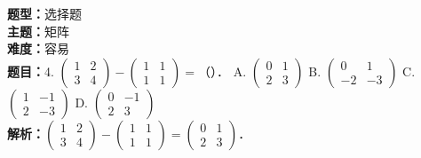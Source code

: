 \documentclass{ctexart}
\newenvironment{question}[5]{%
	\noindent\textbf{题型：}#1\\
	\textbf{主题：}#2\\
	\textbf{难度：}#3\\
	\textbf{题目：}#4\\
	\textbf{解析：}#5\\
	\vspace{1em}
}{}
\begin{document}
	\begin{question}
		{选择题}
		{矩阵}
		{容易}
		{4. \(\left(\begin{array}{ll}1 & 2 \\ 3 & 4\end{array}\right)-\left(\begin{array}{ll}1 & 1 \\ 1 & 1\end{array}\right)=\)（）．
			A. \(\left(\begin{array}{ll}0 & 1 \\ 2 & 3\end{array}\right)\)
			B. \(\left(\begin{array}{cc}0 & 1 \\ -2 & -3\end{array}\right)\)
			C. \(\left(\begin{array}{ll}1 & -1 \\ 2 & -3\end{array}\right)\)
			D. \(\left(\begin{array}{cc}0 & -1 \\ 2 & 3\end{array}\right)\)}
		{\(\left(\begin{array}{ll}1 & 2 \\ 3 & 4\end{array}\right)-\left(\begin{array}{ll}1 & 1 \\ 1 & 1\end{array}\right)=\left(\begin{array}{ll}0 & 1 \\ 2 & 3\end{array}\right)\)．}
	\end{question}
	
\end{document}
